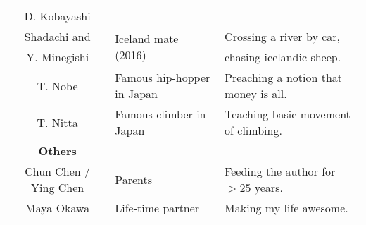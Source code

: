 \begin{table}[h]
\begin{tabularx}{\linewidth}{clX}
    D. Kobayashi        &                                                            &     \\   
    Shadachi and        &   \multirow{2}{*}{Iceland mate (2016)}                                      &  Crossing a river by car,    \\   
    Y. Minegishi        &                                                            &  chasing icelandic sheep.   \\
    T. Nobe            &   Famous hip-hopper in Japan                                                     &  Preaching a notion that money is all.   \\   
    T. Nitta           &   Famous climber in Japan                                                        &  Teaching basic movement of climbing.   \\   
    \midrule
    \midrule
    \textbf{Others}     &               & \\
    \midrule
    Chun Chen / Ying Chen  &   Parents                                                 &  Feeding the author for $>25$ years.   \\       
    Maya Okawa             &   Life-time partner                                      &  Making my life awesome.   \\       
    \bottomrule
  \end{tabularx}
\end{table}


